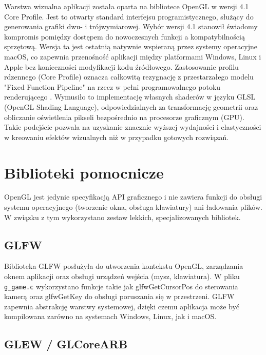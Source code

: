      Warstwa wizualna aplikacji została oparta na bibliotece OpenGL w wersji 4.1 Core Profile. Jest to otwarty standard interfejsu programistycznego, służący do generowania grafiki dwu- i trójwymiarowej. Wybór wersji 4.1 stanowił świadomy kompromis pomiędzy dostępem do nowoczesnych funkcji a kompatybilnością sprzętową. Wersja ta jest ostatnią natywnie wspieraną przez systemy operacyjne macOS, co zapewnia przenośność aplikacji między platformami Windows, Linux i Apple bez konieczności modyfikacji kodu źródłowego. Zastosowanie profilu rdzennego (Core Profile) \cite{online_opengl_spec_41} oznacza całkowitą rezygnację z przestarzałego modelu "Fixed Function Pipeline" na rzecz w pełni programowalnego potoku renderującego \cite{book_wright_opengl_superbible}. Wymusiło to implementację własnych shaderów w języku GLSL (OpenGL Shading Language), odpowiedzialnych za transformację geometrii oraz obliczanie oświetlenia pikseli bezpośrednio na procesorze graficznym (GPU). Takie podejście pozwala na uzyskanie znacznie wyższej wydajności i elastyczności w kreowaniu efektów wizualnych niż w przypadku gotowych rozwiązań.

   \newpage

    \section{Biblioteki pomocnicze}

     OpenGL jest jedynie specyfikacją API graficznego i nie zawiera funkcji do obsługi systemu operacyjnego (tworzenie okna, obsługa klawiatury) ani ładowania plików. W związku z tym wykorzystano zestaw lekkich, specjalizowanych bibliotek.

        \subsection{GLFW}

         Biblioteka GLFW \cite{online_glfw_docs} posłużyła do utworzenia kontekstu OpenGL, zarządzania oknem aplikacji oraz obsługi urządzeń wejścia (mysz, klawiatura).
         W pliku \texttt{g\_game.c} wykorzystano funkcje takie jak glfwGetCursorPos do sterowania kamerą oraz glfwGetKey do obsługi poruszania się w przestrzeni. GLFW zapewnia abstrakcję warstwy systemowej, dzięki czemu aplikacja może być kompilowana zarówno na systemach Windows, Linux, jak i macOS.

        \subsection{GLEW / GLCoreARB}

